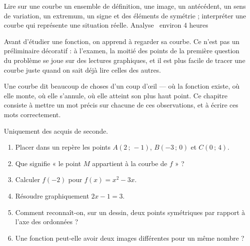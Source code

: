   {Lire sur une courbe un ensemble de définition, une image, un antécédent,
   un sens de variation, un extremum, un signe et des éléments de symétrie ;
   interpréter une courbe qui représente une situation réelle.}
  {Analyse \textbullet\ environ 4 heures}

Avant d'étudier une fonction, on apprend à regarder sa courbe. Ce n'est pas
un préliminaire décoratif : à l'examen, la moitié des points de la première
question du problème se joue sur des lectures graphiques, et il est plus
facile de tracer une courbe juste quand on sait déjà lire celles des autres.

Une courbe dit beaucoup de choses d'un coup d'\oe il — où la fonction existe,
où elle monte, où elle s'annule, où elle atteint son plus haut point. Ce
chapitre consiste à mettre un mot précis sur chacune de ces observations, et
à écrire ces mots correctement.

\begin{revision}
Uniquement des acquis de seconde.

\begin{enumerate}[label=\textbf{\arabic*.}, leftmargin=*, itemsep=0.35em]
  \item Placer dans un repère les points $A(2\,;\,-1)$, $B(-3\,;\,0)$ et
        $C(0\,;\,4)$.
  \item Que signifie « le point $M$ appartient à la courbe de $f$ » ?
  \item Calculer $f(-2)$ pour $f(x) = x^{2}-3x$.
  \item Résoudre graphiquement $2x-1 = 3$.
  \item Comment reconnaît-on, sur un dessin, deux points symétriques par
        rapport à l'axe des ordonnées ?
  \item Une fonction peut-elle avoir deux images différentes pour un même
        nombre ?
\end{enumerate}
\end{revision}

